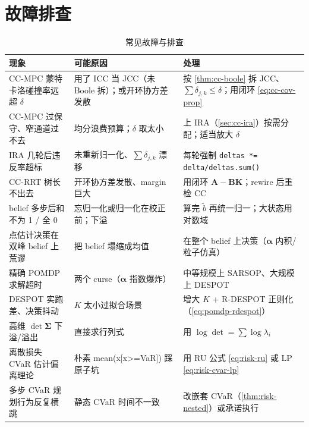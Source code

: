 \section*{故障排查}
\label{sec:plan-chance-trouble}

\begin{table}[H]\centering\small
\caption{常见故障与排查}
\label{tab:plan-chance-trouble}
\begin{tabular}{p{}p{}p{}}
\toprule
现象 & 可能原因 & 处理 \\
\midrule
CC-MPC 蒙特卡洛碰撞率远超 $\delta$ & 用了 ICC 当 JCC（未 Boole 拆）；或开环协方差发散 & 按 \cref{thm:cc-boole} 拆 JCC、$\sum\delta_{j,k}\le\delta$；用闭环 \cref{eq:cc-cov-prop} \\
CC-MPC 过保守、窄通道过不去 & 均分浪费预算；$\delta$ 取太小 & 上 IRA（\cref{sec:cc-ira}）按需分配；适当放大 $\delta$ \\
IRA 几轮后违反率超标 & 未重新归一化、$\sum\delta_{j,k}$ 漂移 & 每轮强制 \texttt{deltas *= delta/deltas.sum()} \\
CC-RRT 树长不出去 & 开环协方差发散、margin 巨大 & 用闭环 $\mathbf{A}-\mathbf{B}\mathbf{K}$；rewire 后重检 CC \\
belief 多步后和不为 1 / 全 0 & 忘归一化或归一化在校正前；下溢 & 算完 $\tilde b$ 再统一归一；大状态用对数域 \\
点估计决策在双峰 belief 上荒谬 & 把 belief 塌缩成均值 & 在整个 belief 上决策（$\boldsymbol{\alpha}$ 内积/粒子仿真）\\
精确 POMDP 求解超时 & 两个 curse（$\boldsymbol{\alpha}$ 指数爆炸）& 中等规模上 SARSOP、大规模上 DESPOT \\
DESPOT 实跑差、决策抖动 & $K$ 太小过拟合场景 & 增大 $K$ + R-DESPOT 正则化（\cref{eq:pomdp-rdespot}）\\
高维 $\det\boldsymbol{\Sigma}$ 下溢/溢出 & 直接求行列式 & 用 $\log\det=\sum\log\lambda_i$ \\
离散损失 CVaR 估计偏离理论 & 朴素 mean(x[x>=VaR]) 踩原子坑 & 用 RU 公式 \cref{eq:risk-ru} 或 LP \cref{eq:risk-cvar-lp} \\
多步 CVaR 规划行为反复横跳 & 静态 CVaR 时间不一致 & 改嵌套 CVaR（\cref{thm:risk-nested}）或承诺执行 \\
\bottomrule
\end{tabular}
\end{table}
